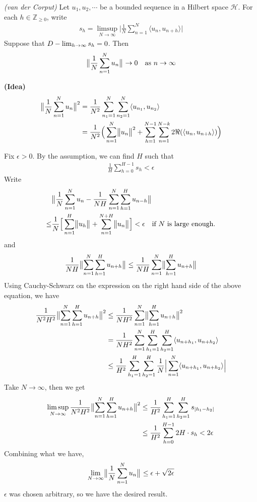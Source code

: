 \documentclass[12pt,a4paper]{report}
\newenvironment{proof}
{\begin{changemargin}{1cm}{0.5cm} 
	}%
	{\end{changemargin}
}
\begin{document}
\lem \emph{(van der Corput)} Let $u_1,u_2,\cdots$ be a bounded sequence in a Hilbert space $\mathscr{H}$. For each $h \in \mathbb{Z}_{\geq 0}$, write
\begin{align*}
s_h = \limsup_{N\rightarrow \infty} \Big| \frac{1}{N} \sum_{n=1}^N \langle u_n, u_{n+h} \rangle \Big|
\end{align*}
Suppose that $D-\lim_{h\rightarrow \infty} s_h =0$. Then
\begin{align*}
\bigl\lVert\frac{1}{N} \sum_{n=1}^N u_n\bigr\rVert_{} \rightarrow 0 \quad \text{as } n\rightarrow \infty
\end{align*}
\begin{proof}
\textbf{(Idea)}
\begin{align*}
\bigl\lVert\frac{1}{N}\sum_{n=1}^N u_n\bigr\rVert_{}^2 &= \frac{1}{N^2} \sum_{n_1=1}^N \sum_{n_2=1}^N \langle u_{n_1}, u_{n_2} \rangle \\
&= \frac{1}{N^2} \Big( \sum_{n=1}^N \bigl\lVert u_n\bigr\rVert_{}^2 + \sum_{h=1}^{N-1} \sum_{n=1}^{N-k} 2 \Re (\langle u_n, u_{n+h} \rangle ) \Big)
\end{align*}
\s

\pf Fix $\epsilon >0$. By the assumption, we can find $H$ such that
\begin{align*}
\frac{1}{H} \sum_{h=0}^{H-1} s_h <\epsilon
\end{align*}
Write
\begin{align*}
& \bigl\lVert\frac{1}{N} \sum_{n=1}^N u_n - \frac{1}{NH} \sum_{n=1}^N \sum_{h=1}^H u_{n-h} \bigr\rVert_{} \\ 
\leq &\frac{1}{N} \Big[ \sum_{n=1}^H \bigl\lVert u_h\bigr\rVert_{} + \sum_{n=1}^{N+H} \bigl\lVert u_n\bigr\rVert_{} \Big] < \epsilon \quad \text{if $N$ is large enough.}
\end{align*}
and
\begin{align*}
\frac{1}{NH} \bigl\lVert\sum_{n=1}^N \sum_{h=1}^H u_{n+h}\bigr\rVert_{} \leq \frac{1}{NH} \sum_{n=1}^N \bigl\lVert\sum_{h=1}^H u_{n+h}\bigr\rVert_{}
\end{align*}
Using Cauchy-Schwarz on the expression on the right hand side of the above equation, we have
\begin{align*}
\frac{1}{N^2 H^2} \bigl\lVert\sum_{n=1}^N \sum_{h=1}^H u_{n+h}\bigr\rVert_{}^2 &\leq \frac{1}{N H^2} \sum_{n=1}^N \bigl\lVert\sum_{h=1}^H u_{n+h}\bigr\rVert_{}^2 \\
& = \frac{1}{NH^2} \sum_{n=1}^N \sum_{h_1=1}^H \sum_{h_2 =1}^H \langle u_{n+h_1}, u_{n+h_2} \rangle \\
& \leq \frac{1}{H^2} \sum_{h_1=1}^H \sum_{h_2 =1}^H \frac{1}{N} \Big| \sum_{n=1}^N \langle u_{n+h_1} , u_{n+h_2} \rangle  \Big|
\end{align*}
Take $N\rightarrow \infty$, then we get
\begin{align*}
\limsup_{N \rightarrow \infty} \frac{1}{N^2 H^2} \bigl\lVert\sum_{n=1}^N \sum_{h=1}^H u_{n+h}\bigr\rVert_{}^2 &\leq \frac{1}{H^2} \sum_{h_1 =1}^H \sum_{h_2=1}^H s_{|h_1 - h_2|} \\
&\leq \frac{1}{H^2} \sum_{h=0}^{H-1} 2H \cdot s_h < 2\epsilon
\end{align*}
Combining what we have,
\begin{align*}
\lim_{N\rightarrow \infty} \bigl\lVert\frac{1}{N} \sum_{n=1}^N u_n\bigr\rVert_{} \leq \epsilon + \sqrt{2\epsilon}
\end{align*}
$\epsilon$ was chosen arbitrary, so we have the desired result.


\end{proof}
\end{document}

